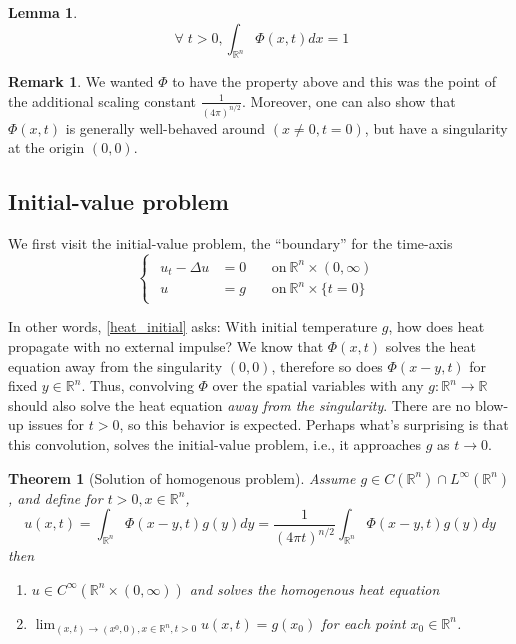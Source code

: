\documentclass[openany, amssymb, psamsfonts]{amsart}
\newtheorem{thm}{Theorem}[section]
\newtheorem{lem}{Lemma}[section]
\theoremstyle{definition}
\newtheorem{rem}{Remark}[section]
\numberwithin{equation}{section}
\newcommand{\bbr}{\mathbb{R}}
\let\oldforall\forall
\renewcommand{\forall}{\;\oldforall\; }
\begin{document}
\begin{lem} \label{conv_1}
\begin{equation*}
    \forall t > 0, \int_{\bbr^n} \Phi(x, t) dx = 1
\end{equation*}
\end{lem}
\begin{rem}
    We wanted $\Phi$ to have the property above and this was the point of the additional scaling constant $\frac{1}{(4\pi)^{n/2}}$. Moreover, one can also show that $\Phi(x, t)$ is generally well-behaved around $(x \neq 0, t = 0)$, but have a singularity at the origin $(0, 0)$.
\end{rem}
\subsection{Initial-value problem}
We first visit the initial-value problem, the ``boundary'' for the time-axis \begin{equation} \label{heat_initial}
    \begin{cases}
        \begin{aligned}
            u_t - \Delta u &= 0 && \:\text{on}\: \bbr^n \times (0, \infty)\\
            u &= g && \:\text{on}\: \bbr^n \times \{t = 0\}  
        \end{aligned}
    \end{cases}
\end{equation}

In other words, \eqref{heat_initial} asks: With initial temperature $g$, how does heat propagate with no external impulse? We know that $\Phi(x, t)$ solves the heat equation away from the singularity $(0, 0)$, therefore so does $\Phi(x - y, t)$ for fixed $y \in \bbr^n$. Thus, convolving $\Phi$ over the spatial variables with any $g: \bbr^n \to \bbr$ should also solve the heat equation \textit{away from the singularity}. There are no blow-up issues for $t>0$, so this behavior is expected. Perhaps what's surprising is that this convolution, solves the initial-value problem, i.e., it approaches $g$ as $t \to 0$.

\begin{thm} [Solution of homogenous problem]
    Assume $g \in C(\bbr^n) \cap L^\infty (\bbr^n)$, and define for $t>0, x \in \bbr^n$, \begin{equation} \label{heat_initial_sln}
        u(x, t) = \int_{\bbr^n}\Phi(x-y, t) g(y) dy = \frac{1}{(4 \pi t)^{n/2}} \int_{\bbr^n} \Phi(x - y, t) g(y) dy
    \end{equation} then \begin{enumerate}
        \item $u \in C^{\infty} (\bbr^n \times (0, \infty))$ and solves the homogenous heat equation
        \item $\lim_{(x, t) \to (x^0, 0), x \in \bbr^n, t>0} u(x, t) = g(x_0)$ for each point $x_0 \in \bbr^n$.
    \end{enumerate}
\end{thm}
\end{document}
